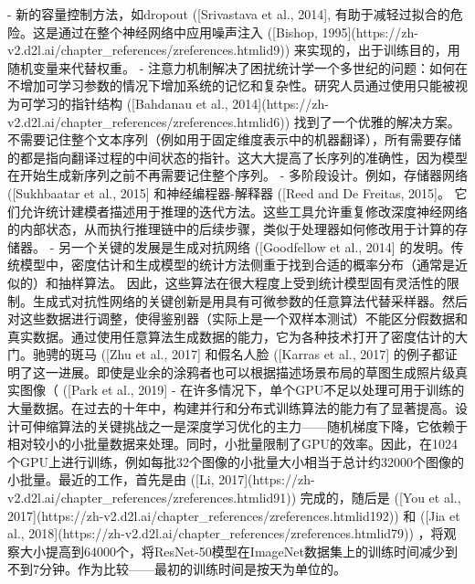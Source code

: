 - 新的容量控制方法，如dropout ([Srivastava et al., 2014], %
有助于减轻过拟合的危险。这是通过在整个神经网络中应用噪声注入 ([Bishop, 1995](https://zh-v2.d2l.ai/chapter\_references/zreferences.htmlid9)) 来实现的，出于训练目的，用随机变量来代替权重。
- 注意力机制解决了困扰统计学一个多世纪的问题：如何在不增加可学习参数的情况下增加系统的记忆和复杂性。研究人员通过使用只能被视为可学习的指针结构 ([Bahdanau et al., 2014](https://zh-v2.d2l.ai/chapter\_references/zreferences.htmlid6)) 找到了一个优雅的解决方案。不需要记住整个文本序列（例如用于固定维度表示中的机器翻译），所有需要存储的都是指向翻译过程的中间状态的指针。这大大提高了长序列的准确性，因为模型在开始生成新序列之前不再需要记住整个序列。
- 多阶段设计。例如，存储器网络 ([Sukhbaatar et al., 2015]%
和神经编程器-解释器 ([Reed and De Freitas, 2015]。%
它们允许统计建模者描述用于推理的迭代方法。这些工具允许重复修改深度神经网络的内部状态，从而执行推理链中的后续步骤，类似于处理器如何修改用于计算的存储器。
- 另一个关键的发展是生成对抗网络 ([Goodfellow et al., 2014]
的发明。传统模型中，密度估计和生成模型的统计方法侧重于找到合适的概率分布（通常是近似的）和抽样算法。
因此，这些算法在很大程度上受到统计模型固有灵活性的限制。生成式对抗性网络的关键创新是用具有可微参数的任意算法代替采样器。然后对这些数据进行调整，使得鉴别器（实际上是一个双样本测试）不能区分假数据和真实数据。通过使用任意算法生成数据的能力，它为各种技术打开了密度估计的大门。驰骋的斑马 ([Zhu et al., 2017]
和假名人脸 ([Karras et al., 2017]%
的例子都证明了这一进展。即使是业余的涂鸦者也可以根据描述场景布局的草图生成照片级真实图像（ ([Park et al., 2019]%
- 在许多情况下，单个GPU不足以处理可用于训练的大量数据。在过去的十年中，构建并行和分布式训练算法的能力有了显著提高。设计可伸缩算法的关键挑战之一是深度学习优化的主力——随机梯度下降，它依赖于相对较小的小批量数据来处理。同时，小批量限制了GPU的效率。因此，在1024个GPU上进行训练，例如每批32个图像的小批量大小相当于总计约32000个图像的小批量。最近的工作，首先是由 ([Li, 2017](https://zh-v2.d2l.ai/chapter\_references/zreferences.htmlid91)) 完成的，随后是 ([You et al., 2017](https://zh-v2.d2l.ai/chapter\_references/zreferences.htmlid192)) 和 ([Jia et al., 2018](https://zh-v2.d2l.ai/chapter\_references/zreferences.htmlid79)) ，将观察大小提高到64000个，将ResNet-50模型在ImageNet数据集上的训练时间减少到不到7分钟。作为比较——最初的训练时间是按天为单位的。
